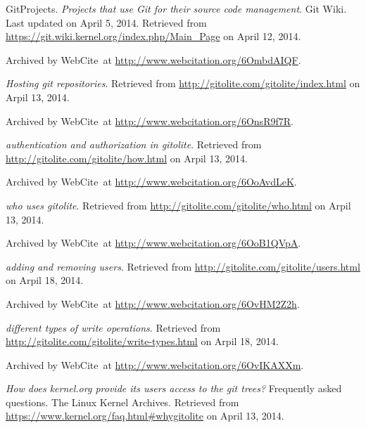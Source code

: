 \begin{thebibliography}{9}

GitProjects. \emph{Projects that use Git for their source code management}. Git
Wiki. Last updated on April 5, 2014. Retrieved from
\url{https://git.wiki.kernel.org/index.php/Main_Page} on April 12, 2014.

Archived by WebCite\textsuperscript{\textregistered}\ at
\url{http://www.webcitation.org/6OmbdAIQF}.


\emph{Hosting git repositories}. Retrieved from
\url{http://gitolite.com/gitolite/index.html} on Arpil 13, 2014.

Archived by WebCite\textsuperscript{\textregistered}\ at
\url{http://www.webcitation.org/6OnsR9f7R}.


\emph{authentication and authorization in gitolite}. Retrieved from
\url{http://gitolite.com/gitolite/how.html} on Arpil 13, 2014.

Archived by WebCite\textsuperscript{\textregistered}\ at
\url{http://www.webcitation.org/6OoAvdLeK}.


\emph{who uses gitolite}. Retrieved from
\url{http://gitolite.com/gitolite/who.html} on Arpil 13, 2014.

Archived by WebCite\textsuperscript{\textregistered}\ at
\url{http://www.webcitation.org/6OoB1QVpA}.


\emph{adding and removing users}. Retrieved from
\url{http://gitolite.com/gitolite/users.html} on Arpil 18, 2014.

Archived by WebCite\textsuperscript{\textregistered}\ at
\url{http://www.webcitation.org/6OvHM2Z2h}.


\emph{different types of write operations}. Retrieved from
\url{http://gitolite.com/gitolite/write-types.html} on Arpil 18, 2014.

Archived by WebCite\textsuperscript{\textregistered}\ at
\url{http://www.webcitation.org/6OvIKAXXm}.


\emph{How does kernel.org provide its users access to the git trees?}
Frequently asked questions. The Linux Kernel Archives. Retrieved from
\url{https://www.kernel.org/faq.html#whygitolite} on April 13, 2014.


\end{thebibliography}
